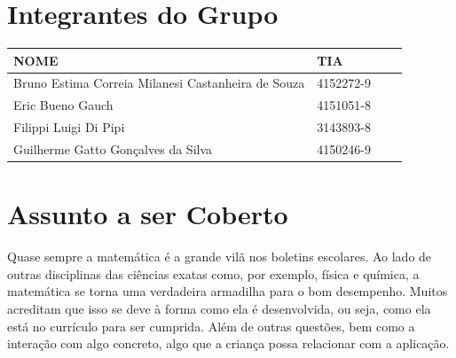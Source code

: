 \documentclass[
    12pt,               %
    openany,          	%
    twoside,            %
    a4paper,            %
    brazil              %
    ]{abntex2}
\begin{document}
\frenchspacing 


\imprimircapa

\imprimirfolhaderosto*

\clearpage
{}
\tableofcontents*
\cleardoublepage

\textual

\chapter{Integrantes do Grupo}

\begin{center}
\begin{tabular}{ | l | l | l | p{5cm} |}
\hline
NOME & TIA \\ \hline
Bruno Estima Correia Milanesi Castanheira de Souza
& 4152272-9 \\ \hline
Eric Bueno Gauch & 4151051-8 \\ \hline
Filippi Luigi Di Pipi & 3143893-8 \\ \hline
Guilherme Gatto Gonçalves da Silva & 4150246-9 \\ \hline
\end{tabular}
\end{center}

\chapter{Assunto a ser Coberto}

Quase sempre a matemática é a grande vilã nos boletins escolares. Ao lado de
outras disciplinas das ciências exatas como, por exemplo, física e química, a
matemática se torna uma verdadeira armadilha para o bom desempenho. Muitos
acreditam que isso se deve à forma como ela é desenvolvida, ou seja, como ela
está no currículo para ser cumprida. Além de outras questões, bem como a
interação com algo concreto, algo que a criança possa relacionar com a
aplicação.
\end{document}
